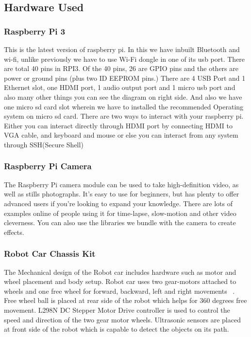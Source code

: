 \documentclass[sigconf]{acmart}
\begin{document}
\subsection{Hardware Used}
\subsubsection{Raspberry Pi 3}
This is the latest version of raspberry pi. In this we have inbuilt Bluetooth and wi-fi, unlike previously we have to use Wi-Fi dongle in one of its usb port. There are total 40 pins in RPI3. Of the 40 pins, 26 are GPIO pins and the others are power or ground pins (plus two ID EEPROM pins.) There are 4 USB Port and 1 Ethernet slot, one HDMI port, 1 audio output port and 1 micro usb port and also many other things you can see the diagram on right side. And also we have one micro sd card slot wherein we have to installed the recommended Operating system on micro sd card. There are two ways to interact with your raspberry pi. Either you can interact directly through HDMI port by connecting HDMI to VGA cable, and keyboard and mouse or else you can interact from any system through SSH(Secure Shell)

\subsubsection{Raspberry Pi Camera}
The Raspberry Pi camera module can be used to take high-definition video, as well as stills photographs. It’s easy to use for beginners, but has plenty to offer advanced users if you’re looking to expand your knowledge. There are lots of examples online of people using it for time-lapse, slow-motion and other video cleverness. You can also use the libraries we bundle with the camera to create effects.

\subsubsection{Robot Car Chassis Kit}
The Mechanical design of the Robot car includes hardware such as motor and wheel placement and body setup. Robot car uses two gear-motors attached to wheels and one free wheel for forward, backward, left and right movements ~\cite{arduino2015}. Free wheel ball is placed at rear side of the robot which helps for 360 degrees free movement. L298N DC Stepper Motor Drive controller is used to control the speed and direction of the two gear motor wheels. Ultrasonic sensors are placed at front side of the robot which is capable to detect the objects on its path.
\end{document}
